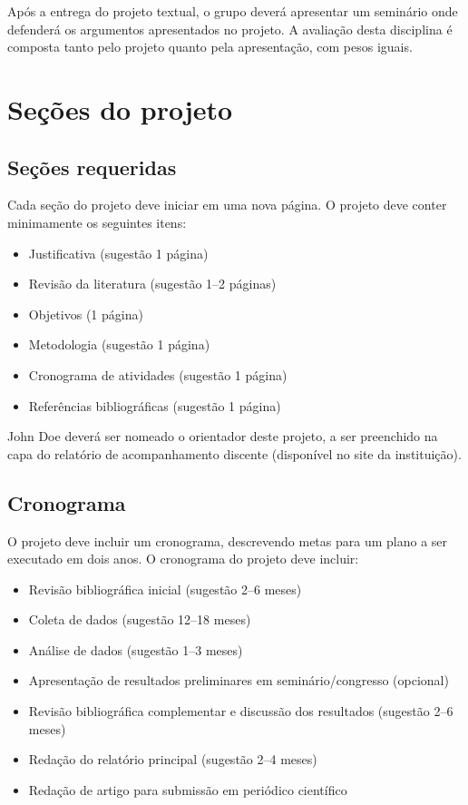 \documentclass[a4paper]{article}
\begin{document}
Após a entrega do projeto textual, o grupo deverá apresentar um
seminário onde defenderá os argumentos apresentados no projeto. A
avaliação desta disciplina é composta tanto pelo projeto quanto pela
apresentação, com pesos iguais.

\section{Seções do projeto}

\subsection{Seções requeridas}

Cada seção do projeto deve iniciar em uma nova página. O projeto deve
conter minimamente os seguintes itens:

\begin{itemize}
\item Justificativa (sugestão 1 página)
\item Revisão da literatura (sugestão 1--2 páginas)
\item Objetivos (1 página)
\item Metodologia (sugestão 1 página)
\item Cronograma de atividades (sugestão 1 página)
\item Referências bibliográficas (sugestão 1 página)
\end{itemize}

John Doe deverá ser nomeado o orientador deste projeto, a ser
preenchido na capa do relatório de acompanhamento discente (disponível
no site da instituição).

\subsection{Cronograma}

O projeto deve incluir um cronograma, descrevendo metas para um plano
a ser executado em dois anos. O cronograma do projeto deve incluir:

\begin{itemize}
\item Revisão bibliográfica inicial (sugestão 2--6 meses)
\item Coleta de dados (sugestão 12--18 meses)
\item Análise de dados (sugestão 1--3 meses)
\item Apresentação de resultados preliminares em seminário/congresso
  (opcional)
\item Revisão bibliográfica complementar e discussão dos resultados
  (sugestão 2--6 meses)
\item Redação do relatório principal (sugestão 2--4 meses)
\item Redação de artigo para submissão em periódico científico
\end{itemize}
\end{document}
